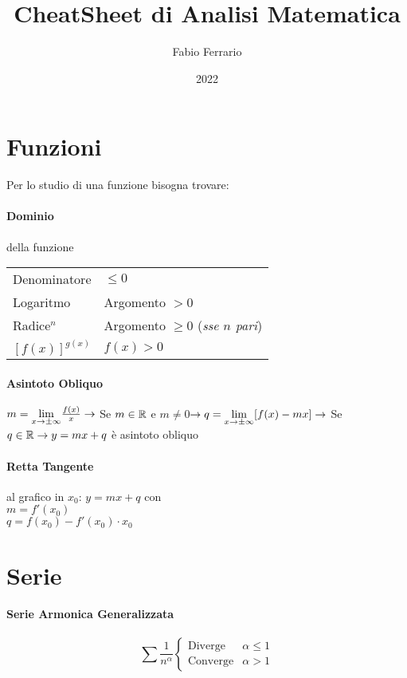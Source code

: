 \documentclass[12pt, a4paper, openany]{book}
\begin{document}
\title{CheatSheet di Analisi Matematica}
\author{Fabio Ferrario}
\date{2022}
\maketitle
\section*{Funzioni}
Per lo studio di una funzione bisogna trovare:
\paragraph*{Dominio} della funzione\\

\begin{tabular}{ l|l } 
	Denominatore & $\leq 0$   \\ 
	Logaritmo & Argomento $>0$\\ 
	Radice$^n$& Argomento $\geq 0$ (\emph{sse $n$ pari})	 \\ 
	$[f(x)]^{g(x)}$ &   $f(x)>0$
\end{tabular}

\paragraph*{Asintoto Obliquo}
$m= \underset{x \to \pm \infty}{\lim} \frac{f(x)}{x} \rightarrow$ Se $m\in\mathbb{R}$ e $m\neq 0$$ \rightarrow q=\underset{x \to \pm \infty}{\lim} [f(x)-mx] \rightarrow$ Se $q\in\mathbb{R} \rightarrow y=mx+q$ è asintoto obliquo

	\paragraph*{Retta Tangente} al grafico in $x_0$: $y=mx + q$ con
	\\$m= f'(x_0)$
\\$q=f(x_0)-f'(x_0)\cdot x_0$


	\section*{Serie}
	\paragraph*{Serie Armonica Generalizzata}
	\begin{equation*}
		\sum \frac{1}{n^\alpha} \begin{cases}
			\text{Diverge}  & \alpha\leq 1 \\
			\text{Converge} & \alpha> 1
		\end{cases}
	\end{equation*}
\end{document}
